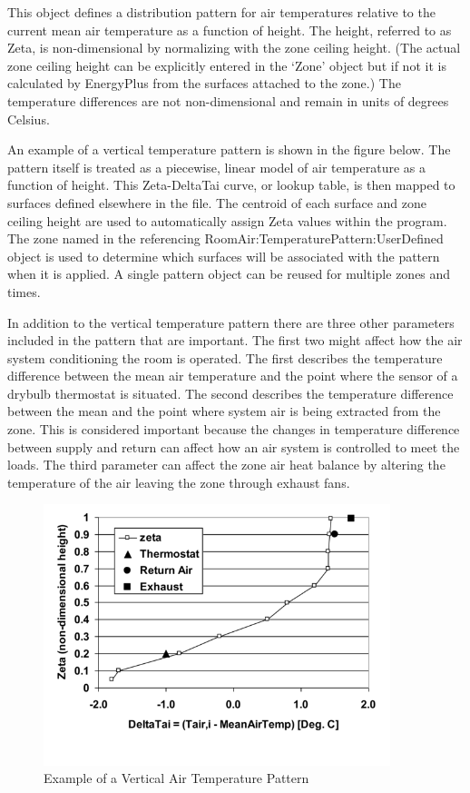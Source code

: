 This object defines a distribution pattern for air temperatures relative to the current mean air temperature as a function of height. The height, referred to as Zeta, is non-dimensional by normalizing with the zone ceiling height. (The actual zone ceiling height can be explicitly entered in the `Zone' object but if not it is calculated by EnergyPlus from the surfaces attached to the zone.) The temperature differences are not non-dimensional and remain in units of degrees Celsius.

An example of a vertical temperature pattern is shown in the figure below. The pattern itself is treated as a piecewise, linear model of air temperature as a function of height. This Zeta-DeltaTai curve, or lookup table, is then mapped to surfaces defined elsewhere in the file. The centroid of each surface and zone ceiling height are used to automatically assign Zeta values within the program. The zone named in the referencing RoomAir:TemperaturePattern:UserDefined object is used to determine which surfaces will be associated with the pattern when it is applied. A single pattern object can be reused for multiple zones and times.

In addition to the vertical temperature pattern there are three other parameters included in the pattern that are important. The first two might affect how the air system conditioning the room is operated. The first describes the temperature difference between the mean air temperature and the point where the sensor of a drybulb thermostat is situated. The second describes the temperature difference between the mean and the point where system air is being extracted from the zone. This is considered important because the changes in temperature difference between supply and return can affect how an air system is controlled to meet the loads. The third parameter can affect the zone air heat balance by altering the temperature of the air leaving the zone through exhaust fans.

\begin{figure}[hbtp] %
\centering
\includegraphics[width=0.9\textwidth, height=0.9\textheight, keepaspectratio=true]{media/image079.png}
\caption{Example of a Vertical Air Temperature Pattern \protect \label{fig:example-of-a-vertical-air-temperature-pattern}}
\end{figure}

